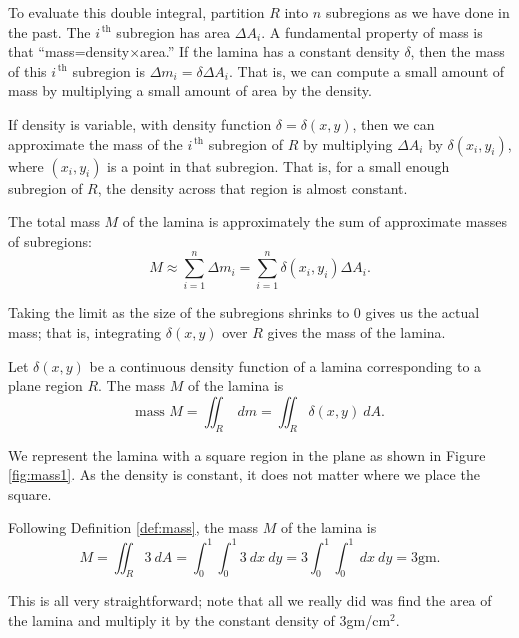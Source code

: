 To evaluate this double integral, partition $R$ into $n$ subregions as we have done in the past. The $i^{\,\text{th}}$ subregion has area $\Delta A_i$. 
A fundamental property of mass is that ``mass=density$\times$area.'' If the lamina has a constant density $\delta$, then the mass of this $i^{\,\text{th}}$ subregion is $\Delta m_i=\delta\Delta A_i$. %
That is, we can compute a small amount of mass by multiplying a small amount of area by the density.

If density is variable, with density function $\delta= \delta(x,y)$, then we can approximate the mass of the $i^{\,\text{th}}$ subregion of $R$ by multiplying $\Delta A_i$ by $\delta(x_i,y_i)$, where $(x_i,y_i)$ is a point in that subregion. That is, for a small enough subregion of $R$, the density across that region is almost constant. 


The total mass $M$ of the lamina is approximately the sum of approximate masses of subregions:
$$M \approx \sum_{i=1}^n \Delta m_i = \sum_{i=1}^n \delta(x_i,y_i)\Delta A_i.$$

Taking the limit as the size of the subregions shrinks to 0 gives us the actual mass; that is, integrating $\delta(x,y)$ over $R$ gives the mass of the lamina.

{Let $\delta(x,y)$ be a continuous density function of a lamina corresponding to a plane region $R$. The mass $M$ of the lamina is
$$\text{mass } M = \iint_R\ dm = \iint_R \delta(x,y)\ dA.$$
}

{We represent the lamina with a square region in the plane as shown in Figure \ref{fig:mass1}. As the density is constant, it does not matter where we place the square.

Following Definition \ref{def:mass}, the mass $M$ of the lamina is
$$M = \iint_R 3\ dA = \int_0^1\int_0^1 3\ dx\ dy = 3\int_0^1\int_0^1 \ dx\ dy=3\text{gm}.$$

This is all very straightforward; note that all we really did was find the area of the lamina and multiply it by the constant density of 3gm/cm$^2$.
}\\

